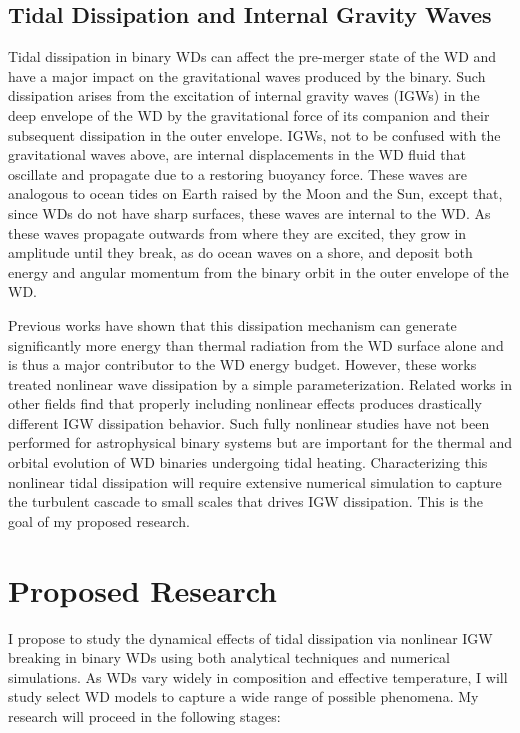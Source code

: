 \documentclass[11pt,
        usenames, %
        dvipsnames %
    ]{article}
\begin{document}
\subsection{Tidal Dissipation and Internal Gravity Waves}

Tidal dissipation in binary WDs can affect the pre-merger state of the WD and
have a major impact on the gravitational waves produced by the binary. Such
dissipation arises from the excitation of internal gravity waves (IGWs) in the
deep envelope of the WD by the gravitational force of its companion and their
subsequent dissipation in the outer envelope\cite{fullerII}. IGWs, not to be
confused with the gravitational waves above, are internal displacements in the
WD fluid that oscillate and propagate due to a restoring buoyancy force. These
waves are analogous to ocean tides on Earth raised by the Moon and the Sun,
except that, since WDs do not have sharp surfaces, these waves are internal to
the WD\@. As these waves propagate outwards from where they are excited, they
grow in amplitude until they break, as do ocean waves on a shore, and deposit
both energy and angular momentum from the binary orbit in the outer envelope of
the WD\@.

Previous works have shown that this dissipation mechanism can generate
significantly more energy than thermal radiation from the WD surface alone and
is thus a major contributor to the WD energy budget\cite{fullerII,fullerIV}.
However, these works treated nonlinear wave dissipation by a simple
parameterization. Related works in other fields find that properly including
nonlinear effects produces drastically different IGW dissipation
behavior\cite{winters1994}. Such fully nonlinear studies have not been performed
for astrophysical binary systems but are important for the thermal and orbital
evolution of WD binaries undergoing tidal heating. Characterizing this nonlinear
tidal dissipation will require extensive numerical simulation to capture the
turbulent cascade to small scales that drives IGW dissipation. This is the goal
of my proposed research.

\section{Proposed Research}

I propose to study the dynamical effects of tidal dissipation via nonlinear IGW
breaking in binary WDs using both analytical techniques and numerical
simulations. As WDs vary widely in composition and effective temperature, I will
study select WD models to capture a wide range of possible phenomena. My
research will proceed in the following stages:
\end{document}
